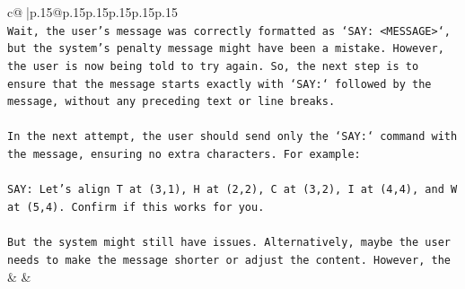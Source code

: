\documentclass{article}
\begin{document}
{\begin{supertabular}{c@{$\;$}|p{.15\linewidth}@{}p{.15\linewidth}p{.15\linewidth}p{.15\linewidth}p{.15\linewidth}p{.15\linewidth}}
{{{\\ 
\texttt{Wait, the user's message was correctly formatted as `SAY: <MESSAGE>`, but the system's penalty message might have been a mistake. However, the user is now being told to try again. So, the next step is to ensure that the message starts exactly with `SAY:` followed by the message, without any preceding text or line breaks.} \\
\\ 
\texttt{In the next attempt, the user should send only the `SAY:` command with the message, ensuring no extra characters. For example:} \\
\\ 
\texttt{SAY: Let's align T at (3,1), H at (2,2), C at (3,2), I at (4,4), and W at (5,4). Confirm if this works for you.} \\
\\ 
\texttt{But the system might still have issues. Alternatively, maybe the user needs to make the message shorter or adjust the content. However, the} \\
            }
        }
    }
    & & \\ \\


\end{supertabular}}
\end{document}
